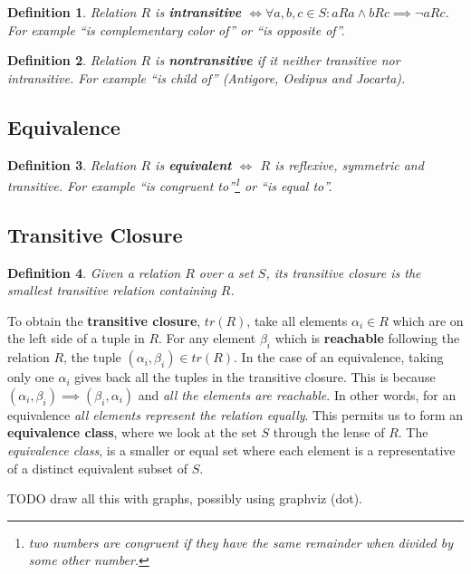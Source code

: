 \documentclass[11pt]{article}
\theoremstyle{plain}
\newtheorem{defn}{Definition}
\theoremstyle{definition}
\begin{document}
\begin{defn}
  Relation $R$ is \textbf{intransitive} $\iff \forall a, b, c \in S: aRa \land bRc \implies \neg aRc$.
  For example ``is complementary color of'' or ``is opposite of''.
\end{defn}

\begin{defn}
  Relation $R$ is \textbf{nontransitive} if it neither transitive nor intransitive.
  For example ``is child of'' (Antigore, Oedipus and Jocarta).
\end{defn}


\subsection{Equivalence}

\begin{defn}
  Relation $R$ is \textbf{equivalent} $\iff$ $R$ is reflexive, symmetric and transitive.
  For example ``is congruent to''\footnote{two numbers are congruent if they have the same remainder when divided by some other number.} or ``is equal to''.
\end{defn}

\subsection{Transitive Closure}

\begin{defn}
 Given a relation $R$ over a set $S$, its transitive closure is the smallest transitive relation containing $R$.
\end{defn}

To obtain the \textbf{transitive closure}, $tr(R)$, take all elements $\alpha_i \in R$ which are on the left side of a tuple in $R$.
For any element $\beta_i$ which is \textbf{reachable} following the relation $R$, the tuple $(\alpha_i, \beta_i) \in tr(R)$.
In the case of an equivalence, taking only one $\alpha_i$ gives back all the tuples in the transitive closure.
This is because $(\alpha_i, \beta_i) \implies (\beta_i, \alpha_i)$ and \emph{all the elements are reachable}.
In other words, for an equivalence \emph{all elements represent the relation equally}.
This permits us to form an \textbf{equivalence class}, where we look at the set $S$ through the lense of $R$.
The \emph{equivalence class}, is a smaller or equal set where each element is a representative of a distinct equivalent subset of $S$.

TODO draw all this with graphs, possibly using graphviz (dot).
\end{document}
